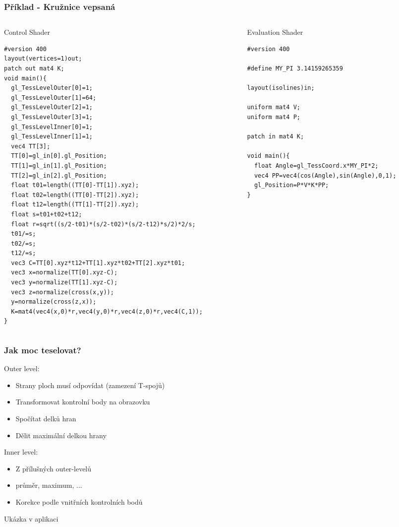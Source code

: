 \begin{frame}[fragile]
    \frametitle{Příklad - Kružnice vepsaná}
  \begin{columns}[T]
    \begin{column}{.44\textwidth}
      Control Shader
  	{\tiny
\begin{verbatim}
#version 400
layout(vertices=1)out;
patch out mat4 K;
void main(){
  gl_TessLevelOuter[0]=1;
  gl_TessLevelOuter[1]=64;
  gl_TessLevelOuter[2]=1;
  gl_TessLevelOuter[3]=1;
  gl_TessLevelInner[0]=1;
  gl_TessLevelInner[1]=1;
  vec4 TT[3];
  TT[0]=gl_in[0].gl_Position;
  TT[1]=gl_in[1].gl_Position;
  TT[2]=gl_in[2].gl_Position;
  float t01=length((TT[0]-TT[1]).xyz);
  float t02=length((TT[0]-TT[2]).xyz);
  float t12=length((TT[1]-TT[2]).xyz);
  float s=t01+t02+t12;
  float r=sqrt((s/2-t01)*(s/2-t02)*(s/2-t12)*s/2)*2/s;
  t01/=s;
  t02/=s;
  t12/=s;
  vec3 C=TT[0].xyz*t12+TT[1].xyz*t02+TT[2].xyz*t01;
  vec3 x=normalize(TT[0].xyz-C);
  vec3 y=normalize(TT[1].xyz-C);
  vec3 z=normalize(cross(x,y));
  y=normalize(cross(z,x));
  K=mat4(vec4(x,0)*r,vec4(y,0)*r,vec4(z,0)*r,vec4(C,1));
}
  	\end{verbatim}
		}
    \end{column}
    \begin{column}{.48\textwidth}
      Evaluation Shader
  	{\tiny
\begin{verbatim}
#version 400

#define MY_PI 3.14159265359

layout(isolines)in;

uniform mat4 V;
uniform mat4 P;

patch in mat4 K;

void main(){
  float Angle=gl_TessCoord.x*MY_PI*2;
  vec4 PP=vec4(cos(Angle),sin(Angle),0,1);
  gl_Position=P*V*K*PP;
}
  	\end{verbatim}
		}
    \end{column}
  \end{columns}

\end{frame}


\begin{frame}
\frametitle{Jak moc teselovat?}
	Outer level:
	\begin{itemize}
	\item Strany ploch musí odpovídat (zamezení T-spojů)
	\item Transformovat kontrolní body na obrazovku
	\item Spočítat delků hran
	\item Dělit maximální delkou hrany
	\end{itemize}
	Inner level:
	\begin{itemize}
	\item Z přílušných outer-levelů
	\item průměr, maximum, ...
	\item Korekce podle vnitřních kontrolních bodů
	\end{itemize}
	Ukázka v aplikaci
\end{frame}

